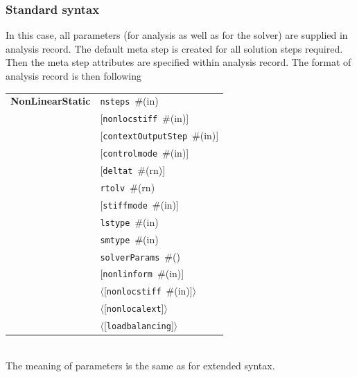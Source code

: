 \documentclass[a4paper]{article}
\makeatletter
\newcommand{\param}[1]{\texttt{#1}} %
\newcommand{\optional}[1]{[#1]} %
\newcommand{\field}[2]{\param{#1}~\#{\tiny(#2)}} %
\newcommand{\optField}[2]{\optional{\field{#1}{#2}}}
\newcommand{\optFieldnotype}[1]{[\param{#1}]}
\newcommand{\entKeywordInst}[1]{\textbf{#1}} %
\renewcommand{\parallel}[1]{$\langle${#1}$\rangle$}
\newcommand{\PoptField      }[2]{\parallel{\optField{#1}{#2}}}
\newcommand{\PoptFieldnotype}[1]{\parallel{\optFieldnotype{#1}}}
\newenvironment{record}[1][]{\begin{tabular}{|ll}}{\end{tabular}\\}
\newcommand{\recentry}[2]{{#1}&{#2}\\}
\newcounter{rcc}
\newenvironment{record}[1][\textwidth]{\setcounter{rcc}{0}\begin{tabular*}{#1}{|ll@{\extracolsep{\fill}}r}}{\end{tabular*}\\}
\newcommand{\recentry}[2]{\ifthenelse{\value{rcc}>0}{&$\backslash$ \\}{\setcounter{rcc}{1}}{#1}&{#2}}
\makeatother
\begin{document}
\subsubsection{Standard syntax}
In this case, all parameters (for analysis as well as for the solver)
are supplied in analysis record. The default meta step is created for
all solution steps required. Then the meta step attributes are
specified within analysis record. The format of analysis record is
then following\\

\noindent
\begin{record}
  \recentry{\entKeywordInst{NonLinearStatic}}{\field{nsteps}{in}}
  \recentry{}{\optField{nonlocstiff}{in}}
  \recentry{}{\optField{contextOutputStep}{in}}
  \recentry{}{\optField{controlmode}{in}}
  \recentry{}{\optField{deltat}{rn}}
  \recentry{}{\field{rtolv}{rn}}
  \recentry{}{\optField{stiffmode}{in}}
  \recentry{}{\field{lstype}{in}}
  \recentry{}{\field{smtype}{in}}
  \recentry{}{\field{solverParams}{}}
  \recentry{}{\optField{nonlinform}{in}}
  \recentry{}{\PoptField{nonlocstiff}{in}}
  \recentry{}{\PoptFieldnotype{nonlocalext}}
  \recentry{}{\PoptFieldnotype{loadbalancing}}
\end{record}
The meaning of parameters is the same as for extended syntax.

%
\end{document}
